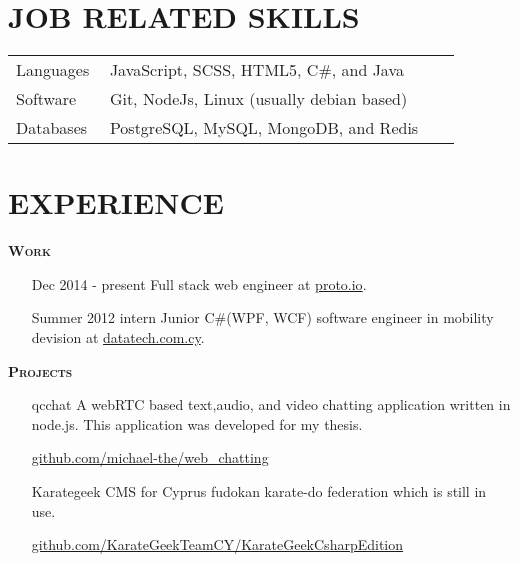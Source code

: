 \documentclass[margin, 10pt]{res} %
\begin{document}
\begin{resume}
\begin{tabular}{p{0.2\linewidth} p{0.75\linewidth}}
\end{tabular}

\section{JOB RELATED SKILLS}

\begin{tabular}{p{0.2\linewidth} p{0.75\linewidth}}

Languages & JavaScript, SCSS, HTML5, C\#, and Java \\
Software & Git, NodeJs, Linux (usually debian based) \\
Databases & PostgreSQL, MySQL, MongoDB, and Redis

\end{tabular}

\section{EXPERIENCE}

\textsc{ \textbf{Work}}

\begin{itemize}

\item[Dec 2014 - present] Full stack web engineer at
\href{https://proto.io/}{proto.io}. \\

\item[Summer 2012 intern] Junior C\#(WPF, WCF) software engineer in mobility devision at
\href{http://www.datatech.com.cy/}{datatech.com.cy}. \\

\end{itemize}

\textsc{ \textbf{Projects}}

\begin{itemize}

\item[qcchat] A webRTC based text,audio, and video chatting application written in node.js.
This application was developed for my thesis.

\href{https://github.com/michael-the/web_chatting}{github.com/michael-the/web\_chatting} \\

\item[Karategeek] CMS for Cyprus fudokan karate-do federation which is still in use.

\href{https://github.com/KarateGeekTeamCY/KarateGeekCsharpEdition/tree/baseV4.5.1}{github.com/KarateGeekTeamCY/KarateGeekCsharpEdition} \\


\end{itemize}
\end{resume}
\end{document}
